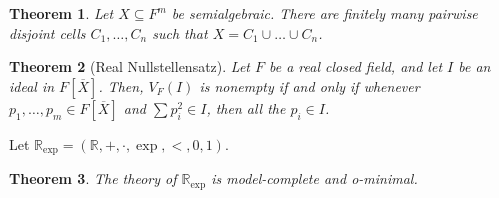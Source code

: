 \documentclass{amsart}
\newtheorem{theorem}{Theorem}[subsection]
\newtheorem{corollary}[theorem]{Corollary}
\theoremstyle{definition}
\numberwithin{equation}{section}
\begin{document}
\begin{tcolorbox}[title = {Cell Decomposition}]
	\begin{theorem}
		Let $X \subseteq F^m$ be semialgebraic.
		There are finitely many pairwise disjoint cells $C_1,\dots,C_n$ such that $X = C_1 \cup \dots \cup C_n$.
	\end{theorem}
\end{tcolorbox}

\begin{theorem}[Real Nullstellensatz]
	Let $F$ be a real closed field,
	and let $I$ be an ideal in $F[\overline{X}]$.
	Then, $V_F(I)$ is nonempty if and only if whenever $p_1,\dots,p_m\in F[\overline{X}]$ and $\sum p_i^2 \in I$,
	then all the $p_i \in I$.
\end{theorem}

Let $\mathbb{R}_{\exp} = (\mathbb{R},+,\cdot,\exp,<,0,1)$.

\begin{theorem}
	The theory of $\mathbb{R}_{\exp}$ is model-complete and o-minimal.
\end{theorem}





\end{document}

